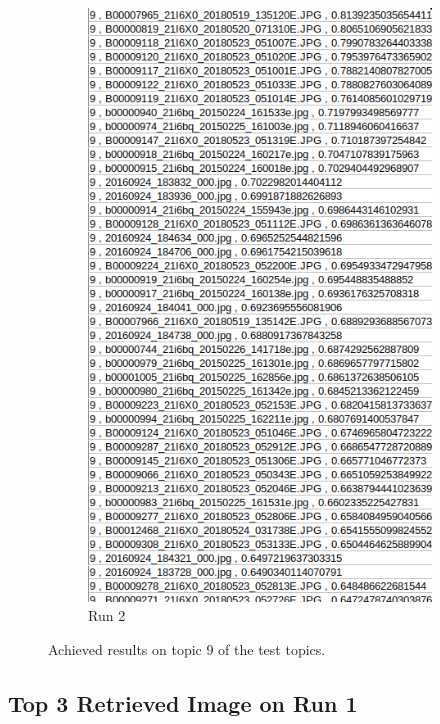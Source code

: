 \begin{figure}[H]
\begin{subfigure}{0.385\textwidth}
  \includegraphics[width=\textwidth]{Sections/7Results/images/topic9results2.png}
  \caption{Run 2}
  \end{subfigure}
  \caption{Achieved results on topic 9 of the test topics.}
  \label{fig:runs_csv}
\end{figure}
\newpage
\subsection{Top 3 Retrieved Image on Run 1}
\label{sec:run1}

